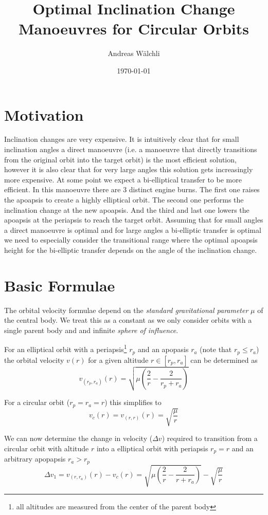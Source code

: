 \documentclass[a4paper, 11pt]{article}
\title{Optimal Inclination Change Manoeuvres for Circular Orbits}
\author{Andreas Wälchli}
\date{\today}
\begin{document}
\maketitle

\section{Motivation}
Inclination changes are very expensive. It is intuitively clear that for small inclination angles a direct manoeuvre (i.e. a manoeuvre that directly transitions from the original orbit into the target orbit) is the most efficient solution, however it is also clear that for very large angles this solution gets increasingly more expensive. At some point we expect a bi-elliptical transfer to be more efficient. In this manoeuvre there are 3 distinct engine burns. The first one raises the apoapsis to create a highly elliptical orbit. The second one performs the inclination change at the new apoapsis. And the third and last one lowers the apoapsis at the periapsis to reach the target orbit. Assuming that for small angles a direct manoeuvre is optimal and for large angles a bi-elliptic transfer is optimal we need to especially consider the transitional range where the optimal apoapsis height for the bi-elliptic transfer depends on the angle of the inclination change.

\section{Basic Formulae}
The orbital velocity formulae depend on the \emph{standard gravitational parameter} $\mu$ of the central body. We treat this as a constant as we only consider orbits with a single parent body and and infinite \emph{sphere of influence}.

For an elliptical orbit with a periapsis\footnote{all altitudes are measured from the center of the parent body} $r_p$ and an apopasis $r_a$ (note that $r_p \leq r_a$) the orbital velocity $v(r)$ for a given altitude $r \in [r_p,r_a]$ can be determined as
$$v_{(r_p,r_a)}(r) = \sqrt{\mu\left(\frac{2}{r}-\frac{2}{r_p + r_a}\right)}$$

For a circular orbit ($r_p = r_a = r$) this simplifies to
$$v_c(r) = v_{(r,r)}(r) = \sqrt{\frac{\mu}{r}}$$

We can now determine the change in velocity ($\Delta{}v$) required to transition from a circular orbit with altitude $r$ into a elliptical orbit with periapsis $r_p = r$ and an arbitrary apopapsis $r_a > r_p$
$$\Delta{}v_1 = v_{(r,r_a)}(r) - v_c(r) = \sqrt{\mu\left(\frac{2}{r}-\frac{2}{r + r_a}\right)} - \sqrt{\frac{\mu}{r}}$$
\end{document}
